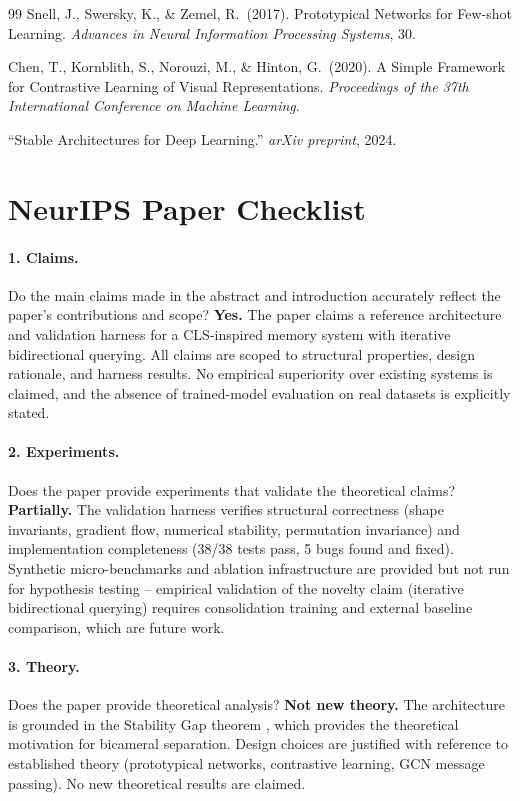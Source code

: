 \documentclass{article}
\begin{document}
{\begin{thebibliography}{99}
  Snell, J., Swersky, K., \& Zemel, R.\ (2017).
  Prototypical Networks for Few-shot Learning.
  \textit{Advances in Neural Information Processing Systems}, 30.

  Chen, T., Kornblith, S., Norouzi, M., \& Hinton, G.\ (2020).
  A Simple Framework for Contrastive Learning of Visual Representations.
  \textit{Proceedings of the 37th International Conference on Machine
  Learning}.

  ``Stable Architectures for Deep Learning.''
  \textit{arXiv preprint}, 2024.

\end{thebibliography}
}

\newpage
\section*{NeurIPS Paper Checklist}

\paragraph{1. Claims.}
Do the main claims made in the abstract and introduction accurately reflect
the paper's contributions and scope?
\textbf{Yes.} The paper claims a reference architecture and validation harness
for a CLS-inspired memory system with iterative bidirectional querying. All
claims are scoped to structural properties, design rationale, and harness
results. No empirical superiority over existing systems is claimed, and the
absence of trained-model evaluation on real datasets is explicitly stated.

\paragraph{2. Experiments.}
Does the paper provide experiments that validate the theoretical claims?
\textbf{Partially.} The validation harness verifies structural correctness
(shape invariants, gradient flow, numerical stability, permutation invariance)
and implementation completeness (38/38 tests pass, 5 bugs found and fixed).
Synthetic micro-benchmarks and ablation infrastructure are provided but not
run for hypothesis testing -- empirical validation of the novelty claim
(iterative bidirectional querying) requires consolidation training and
external baseline comparison, which are future work.

\paragraph{3. Theory.}
Does the paper provide theoretical analysis?
\textbf{Not new theory.} The architecture is grounded in the Stability Gap
theorem \citep{stabilitygap2026}, which provides the theoretical motivation
for bicameral separation. Design choices are justified with reference to
established theory (prototypical networks, contrastive learning, GCN message
passing). No new theoretical results are claimed.
\end{document}
